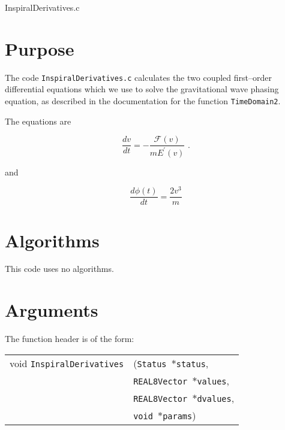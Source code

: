\documentclass[12pt]{article}
\begin{document}
\huge
\begin{center}
InspiralDerivatives.c
\end{center}
\normalsize
\vspace{10mm}

\section{Purpose}

The code \texttt{InspiralDerivatives.c} calculates the two coupled first--order differential equations which we use to solve the gravitational wave phasing equation, as described in the documentation for the function \texttt{TimeDomain2}.

The equations are

\begin{equation}
\frac{dv}{dt} = - \frac{\mathcal{F}(v)}{m E^{\prime}(v)} \,\,.
\label{ode1}
\end{equation}

and

\begin{equation}
\frac{d \phi(t)}{dt} = \frac{2v^{3}}{m}
\label{ode2}
\end{equation}




\section{Algorithms}

This code uses no algorithms.


\section{Arguments}

The function header is of the form:

\vspace{5mm}

\begin{tabular}{ll}
void \texttt{InspiralDerivatives}&(\texttt{Status $\ast$status},     \\
                                   &\texttt{REAL8Vector $\ast$values}, \\
                                   &\texttt{REAL8Vector $\ast$dvalues}, \\
                                   &\texttt{void $\ast$params})
\end{tabular}

\vspace{5mm}
\end{document}
